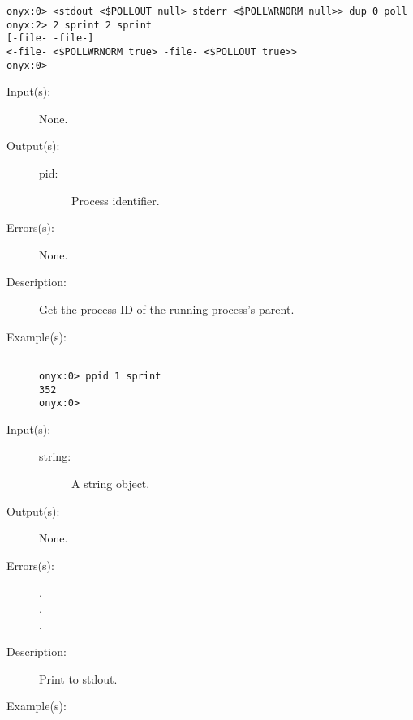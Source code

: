 \begin{description}
\begin{description}
\begin{verbatim}
onyx:0> <stdout <$POLLOUT null> stderr <$POLLWRNORM null>> dup 0 poll
onyx:2> 2 sprint 2 sprint
[-file- -file-]
<-file- <$POLLWRNORM true> -file- <$POLLOUT true>>
onyx:0>
		\end{verbatim}
	\end{description}
\label{systemdict:ppid}
\item[{\onyxop{--}{ppid}{pid}}: ]
	\begin{description}\item[]
	\item[Input(s): ] None.
	\item[Output(s): ]
		\begin{description}\item[]
		\item[pid: ]
			Process identifier.
		\end{description}
	\item[Errors(s): ] None.
	\item[Description: ]
		Get the process ID of the running process's parent.
	\item[Example(s): ]\begin{verbatim}

onyx:0> ppid 1 sprint
352
onyx:0>
		\end{verbatim}
	\end{description}
\label{systemdict:print}
\item[{\onyxop{string}{print}{--}}: ]
	\begin{description}\item[]
	\item[Input(s): ]
		\begin{description}\item[]
		\item[string: ]
			A string object.
		\end{description}
	\item[Output(s): ] None.
	\item[Errors(s): ]
		\begin{description}\item[]
		\item[.]
		\item[.]
		\item[.]
		\end{description}
	\item[Description: ]
		Print  to stdout.
	\item[Example(s): ]\begin{verbatim}


\end{verbatim}
\end{description}
\end{description}
